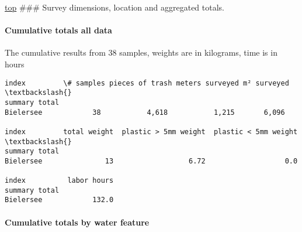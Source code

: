 \documentclass[11pt]{article}
\begin{document}
    \hyperref[top]{top} \#\#\# Survey dimensions, location and aggregated
totals.
 
            
    
    \hypertarget{cumulative-totals-all-data}{%
\paragraph{Cumulative totals all
data}\label{cumulative-totals-all-data}}

The cumulative results from 38 samples, weights are in kilograms, time
is in hours

    

            \begin{tcolorbox}[breakable, size=fbox, boxrule=.5pt, pad at break*=1mm, opacityfill=0]
\begin{Verbatim}[commandchars=\\\{\}]
index         \# samples pieces of trash meters surveyed m² surveyed  \textbackslash{}
summary total
Bielersee            38           4,618           1,215       6,096

index         total weight  plastic > 5mm weight  plastic < 5mm weight  \textbackslash{}
summary total
Bielersee               13                  6.72                   0.0

index          labor hours
summary total
Bielersee            132.0
\end{Verbatim}
\end{tcolorbox}
        
    \hypertarget{cumulative-totals-by-water-feature}{%
\paragraph{Cumulative totals by water
feature}\label{cumulative-totals-by-water-feature}}
\end{document}
